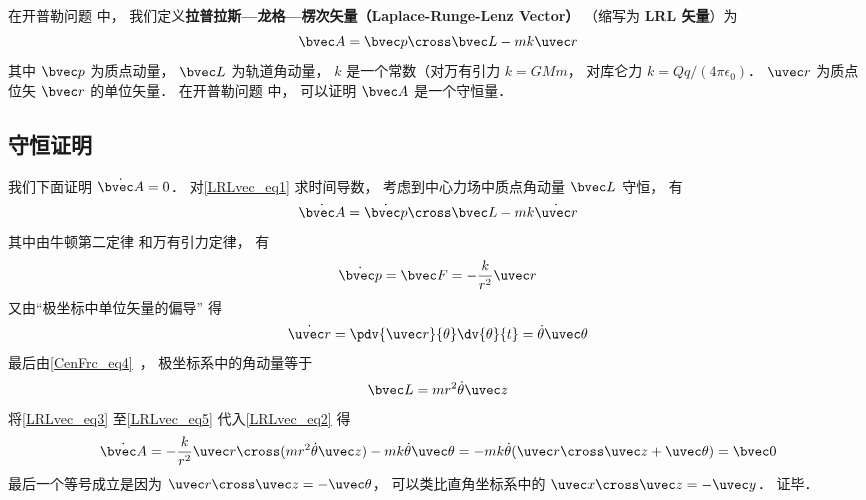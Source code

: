 

在开普勒问题%
中， 我们定义\textbf{拉普拉斯—龙格—楞次矢量（Laplace-Runge-Lenz Vector）} （缩写为 \textbf{LRL 矢量}）为
\begin{equation}\label{LRLvec_eq1}
\bvec A = \bvec p \cross \bvec L - mk \uvec r
\end{equation}
其中 $\bvec p$ 为质点动量， $\bvec L$ 为轨道角动量， $k$ 是一个常数（对万有引力 $k = GMm$， 对库仑力 $k = Qq/(4\pi\epsilon_0)$． $\uvec r$ 为质点位矢 $\bvec r$ 的单位矢量． 在开普勒问题%
中， 可以证明 $\bvec A$ 是一个守恒量．

\subsection{守恒证明}
我们下面证明 $\dot{\bvec A} = 0$． 对\autoref{LRLvec_eq1} 求时间导数， 考虑到中心力场中质点角动量 $\bvec L$ 守恒， 有
\begin{equation}\label{LRLvec_eq2}
\dot{\bvec A} = \dot{\bvec p}\cross \bvec L  - mk\dot{\uvec r}
\end{equation}
其中由牛顿第二定律 和万有引力定律， 有
\begin{equation}\label{LRLvec_eq3}
\dot{\bvec p} = \bvec F = - \frac{k}{r^2}\uvec r
\end{equation}
又由“极坐标中单位矢量的偏导” 得
\begin{equation}\label{LRLvec_eq4}
\dot{\uvec r} = \pdv{\uvec r}{\theta} \dv{\theta}{t} = \dot\theta\uvec \theta
\end{equation}
最后由\autoref{CenFrc_eq4}~， 极坐标系中的角动量等于
\begin{equation}\label{LRLvec_eq5}
\bvec L = mr^2\dot \theta \uvec z
\end{equation}
将\autoref{LRLvec_eq3} 至\autoref{LRLvec_eq5} 代入\autoref{LRLvec_eq2} 得
\begin{equation}
\dot{\bvec A} = -\frac{k}{r^2}\uvec r \cross (mr^2\dot\theta\uvec z) - mk\dot\theta\uvec\theta
=-mk\dot\theta (\uvec r\cross \uvec z + \uvec \theta)
= \bvec 0
\end{equation}
最后一个等号成立是因为 $\uvec r\cross\uvec z = -\uvec\theta$， 可以类比直角坐标系中的 $\uvec x\cross\uvec z = -\uvec y$． 证毕．



